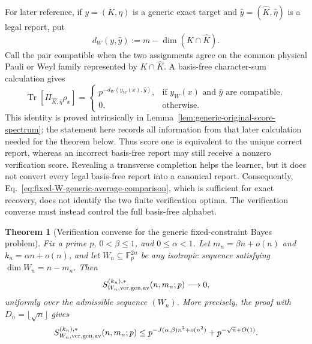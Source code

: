 \documentclass[11pt]{article}
\newcommand{\F}{\mathbb F}
\newcommand{\Tr}{\operatorname{Tr}}
\newcommand{\1}{\mathbf 1}
\theoremstyle{plain}
\newtheorem{theorem}{Theorem}[section]
\theoremstyle{definition}
\theoremstyle{remark}
\begin{document}
For later reference, if $y=(K,\eta)$ is a generic exact target and
$\widehat y=(\widehat K,\widehat\eta)$ is a legal report, put
\begin{equation}
 d_W(y,\widehat y):=m-\dim(K\cap\widehat K).
 \label{eq:section4-generic-original-distance}
\end{equation}
Call the pair compatible when the two assignments agree on the common
physical Pauli or Weyl family represented by $K\cap\widehat K$.  A basis-free character-sum calculation gives
\begin{equation}
 \Tr[\Pi_{\widehat K,\widehat\eta}\rho_x]
 =\begin{cases}
 p^{-d_W(y_W(x),\widehat y)},&
 \text{if $y_W(x)$ and $\widehat y$ are compatible},\\
 0,&\text{otherwise}.
 \end{cases}
 \label{eq:section4-generic-original-score-spectrum}
\end{equation}
This identity is proved intrinsically in
Lemma~\ref{lem:generic-original-score-spectrum}; the statement here records
all information from that later calculation needed for the theorem below.
Thus score one is equivalent to the unique correct report, whereas an
incorrect basis-free report may still receive a nonzero verification score.
Revealing a transverse completion helps the learner, but it does not convert
every legal basis-free report into a canonical report.  Consequently,
Eq.~\eqref{eq:fixed-W-generic-average-comparison}, which is sufficient for
exact recovery, does not identify the two finite verification optima.  The
verification converse must instead control the full basis-free alphabet.

\begin{theorem}[Verification converse for the generic fixed-constraint Bayes problem]
\label{thm:generic-fixed-W-Bayes-verification-converse}
Fix a prime $p$, $0<\beta\le1$, and $0\le\alpha<1$.  Let
$m_n=\beta n+o(n)$ and $k_n=\alpha n+o(n)$, and let
$W_n\subseteq\F_p^{2n}$ be any isotropic sequence satisfying
$\dim W_n=n-m_n$.  Then
\begin{equation}
 S_{W_n,\rm ver,gen,av}^{(k_n),*}(n,m_n;p)\longrightarrow0,
 \label{eq:section4-generic-original-verification-converse}
\end{equation}
uniformly over the admissible sequence $(W_n)$.  More precisely, the proof
with $D_n=\lfloor\sqrt n\rfloor$ gives
\begin{equation}
 S_{W_n,\rm ver,gen,av}^{(k_n),*}(n,m_n;p)
 \le p^{-J(\alpha,\beta)n^2+o(n^2)}+p^{-\sqrt n+O(1)}.
 \label{eq:section4-generic-original-verification-quantitative}
\end{equation}
\end{theorem}
\end{document}
